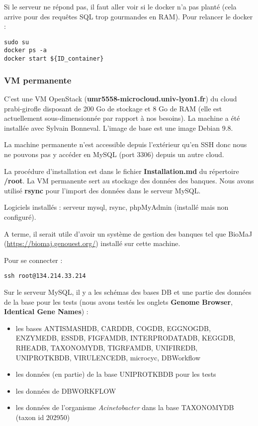 Si le serveur ne répond pas, il faut aller voir si le docker n'a pas planté (cela arrive pour des requêtes SQL trop gourmandes en RAM).
Pour relancer le docker :
\begin{lstlisting}[style=bash]
sudo su
docker ps -a
docker start ${ID_container}
\end{lstlisting}

\subsubsection {VM permanente}\label{VMpermanente}

C'est une VM OpenStack (\textbf{umr5558-microcloud.univ-lyon1.fr}) du cloud prabi-girofle disposant de 200 Go de stockage et 8 Go de RAM (elle est actuellement sous-dimensionnée par rapport à nos besoins). La machine a été installée avec Sylvain Bonneval. L'image de base est une image Debian 9.8.

La machine permanente n'est accessible depuis l'extérieur qu'en SSH donc nous ne pouvons pas y accéder en MySQL (port 3306) depuis un autre cloud.
\newline

La procédure d'installation est dans le fichier \textbf{Installation.md} du répertoire \textbf{/root}. La VM permanente sert au stockage des données des banques. Nous avons utilisé \textbf{rsync} pour l'import des données dans le serveur MySQL.
\newline

Logiciels installés : serveur mysql, rsync, phpMyAdmin (installé mais non configuré). 
\newline

A terme, il serait utile d'avoir un système de gestion des banques tel que BioMaJ (\url{https://biomaj.genouest.org/}) installé sur cette machine.

Pour se connecter : 
\begin{lstlisting}[style=bash]
ssh root@134.214.33.214
\end{lstlisting}
\bigskip

Sur le serveur MySQL, il y a les schémas des bases DB et une partie des données de la base pour les tests (nous avons testés les onglets \textbf{Genome Browser}, \textbf{Identical Gene Names}) :
\begin{itemize}
	\item les bases ANTISMASHDB, CARDDB, COGDB, EGGNOGDB, ENZYMEDB, ESSDB, FIGFAMDB, INTERPRODATADB, KEGGDB, RHEADB, TAXONOMYDB, TIGRFAMDB, UNIFIREDB, UNIPROTKBDB, VIRULENCEDB, microcyc, DBWorkflow
	\item les données (en partie) de la base UNIPROTKBDB pour les tests
	\item les données de DBWORKFLOW
	\item les données de l'organisme \textit{Acinetobacter} dans la base TAXONOMYDB (taxon id 202950)
\end{itemize}

